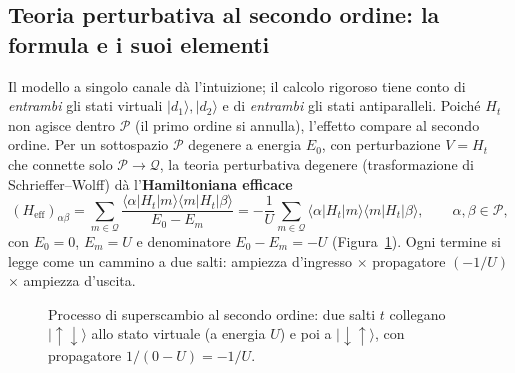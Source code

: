 \documentclass[11pt,a4paper]{article}
\newcommand{\ket}[1]{\lvert #1 \rangle}
\newcommand{\melem}[3]{\langle #1 \vert #2 \vert #3 \rangle}
\newcommand{\up}{\uparrow}
\newcommand{\dn}{\downarrow}
\newcommand{\Heff}{H_{\mathrm{eff}}}
\theoremstyle{definition}
\theoremstyle{remark}
\begin{document}
\FloatBarrier
\subsection{Teoria perturbativa al secondo ordine: la formula e i suoi elementi}
\label{sub:secondorder}

Il modello a singolo canale dà l'intuizione; il calcolo rigoroso tiene conto di \emph{entrambi} gli stati
virtuali $\ket{d_1},\ket{d_2}$ e di \emph{entrambi} gli stati antiparalleli. Poiché $H_t$ non agisce
dentro $\mathcal P$ (il primo ordine si annulla), l'effetto compare al secondo ordine. Per un sottospazio
$\mathcal P$ degenere a energia $E_0$, con perturbazione $V=H_t$ che connette solo $\mathcal P\to\mathcal Q$,
la teoria perturbativa degenere (trasformazione di Schrieffer--Wolff) dà l'\textbf{Hamiltoniana efficace}
\begin{equation}
(\Heff)_{\alpha\beta}=\sum_{m\in\mathcal Q}\frac{\melem{\alpha}{H_t}{m}\melem{m}{H_t}{\beta}}{E_0-E_m}
=-\frac1U\sum_{m\in\mathcal Q}\melem{\alpha}{H_t}{m}\melem{m}{H_t}{\beta},
\qquad \alpha,\beta\in\mathcal P,
\label{eq:secondorder}
\end{equation}
con $E_0=0$, $E_m=U$ e denominatore $E_0-E_m=-U$ (Figura~\ref{fig:super}). Ogni termine si legge come un
cammino a due salti: ampiezza d'ingresso $\times$ propagatore $(-1/U)$ $\times$ ampiezza d'uscita.

\begin{figure}[htbp]
\centering
{}
\caption{Processo di superscambio al secondo ordine: due salti $t$ collegano $\ket{\up\dn}$ allo stato
virtuale (a energia $U$) e poi a $\ket{\dn\up}$, con propagatore $1/(0-U)=-1/U$.}
\label{fig:super}
\end{figure}
\end{document}
